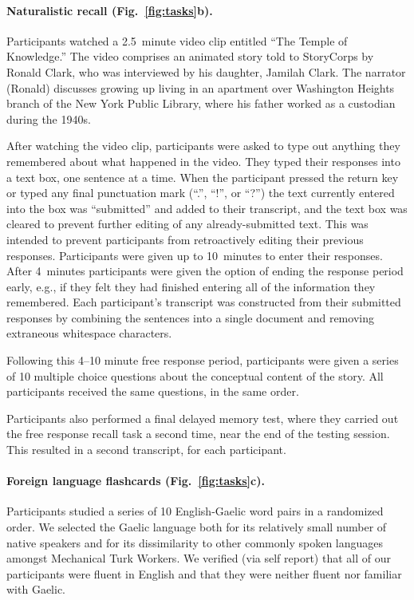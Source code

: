 \documentclass[10pt]{article}
\begin{document}
\paragraph*{Naturalistic recall (Fig.~\ref{fig:tasks}b).}
Participants watched a 2.5~minute video clip entitled ``The Temple of
Knowledge.''  The video comprises an animated story told to StoryCorps
by Ronald Clark, who was interviewed by his daughter, Jamilah Clark.
The narrator (Ronald) discusses growing up living in an apartment over
Washington Heights branch of the New York Public Library, where his
father worked as a custodian during the 1940s.

After watching the video clip, participants were asked to type out
anything they remembered about what happened in the video.  They typed
their responses into a text box, one sentence at a time.  When the
participant pressed the return key or typed any final punctuation mark
(``.'', ``!'', or ``?'') the text currently entered into the box was
``submitted'' and added to their transcript, and the text box was
cleared to prevent further editing of any already-submitted text.
This was intended to prevent participants from retroactively editing
their previous responses.  Participants were given up to 10~minutes to
enter their responses.  After 4~minutes participants were given the
option of ending the response period early, e.g., if they felt they
had finished entering all of the information they remembered.  Each
participant's transcript was constructed from their submitted
responses by combining the sentences into a single document and
removing extraneous whitespace characters.

Following this 4--10 minute free response period, participants were
given a series of 10 multiple choice questions about the conceptual
content of the story.  All participants received the same questions,
in the same order.

Participants also performed a final delayed memory test, where they
carried out the free response recall task a second time, near the end
of the testing session.  This resulted in a second transcript, for
each participant.

\paragraph*{Foreign language flashcards (Fig.~\ref{fig:tasks}c).}
Participants studied a series of 10 English-Gaelic word pairs in a
randomized order.  We selected the Gaelic language both for its
relatively small number of native speakers and for its dissimilarity
to other commonly spoken languages amongst Mechanical Turk Workers.
We verified (via self report) that all of our participants were fluent
in English and that they were neither fluent nor familiar with Gaelic.
\end{document}
